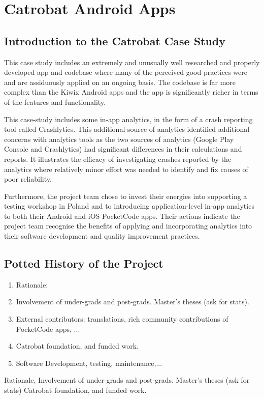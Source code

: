 \section{Catrobat Android Apps}
\label{section-catrobat-case-study}
\subsection{Introduction to the Catrobat Case Study}
This case study includes an extremely and unusually well researched and properly developed app and codebase where many of the perceived good practices were and are assiduously applied on an ongoing basis. The codebase is far more complex than the Kiwix Android apps and the app is significantly richer in terms of the features and functionality.

This case-study includes some in-app analytics, in the form of a crash reporting tool called Crashlytics. This additional source of analytics identified additional concerns with analytics tools as the two sources of analytics (Google Play Console and Crashlytics) had significant differences in their calculations and reports. It illustrates the efficacy of investigating crashes reported by the analytics where relatively minor effort was needed to identify and fix causes of poor reliability.

Furthermore, the project team chose to invest their energies into supporting a testing workshop in Poland and to introducing application-level in-app analytics to both their Android and iOS PocketCode apps. Their actions indicate the project team recognise the benefits of applying and incorporating analytics into their software development and quality improvement practices.

\subsection{Potted History of the Project}
\begin{enumerate}
    \item Rationale:
    \item Involvement of under-grads and post-grads. Master's theses (ask for stats).
    \item External contributors: translations, rich community contributions of PocketCode apps, ...
    \item Catrobat foundation, and funded work.
    \item Software Development, testing, maintenance,...
\end{enumerate}
Rationale,
Involvement of under-grads and post-grads. Master's theses (ask for stats)
Catrobat foundation, and funded work.

